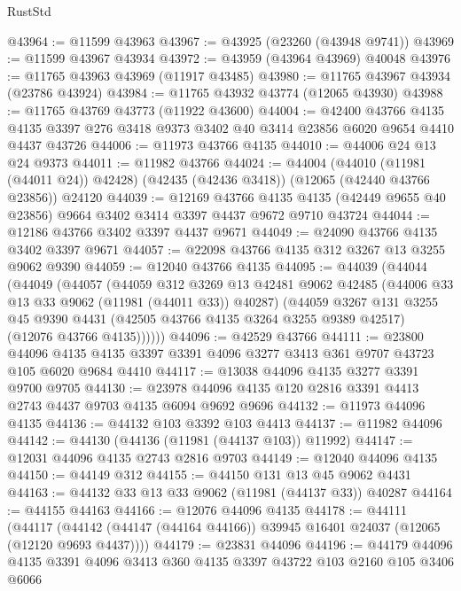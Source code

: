 \begin{lexlean}{RustStd}
\begin{coremodule}
@43964 := @11599 @43963
@43967 := @43925 (@23260 (@43948 @9741))
@43969 := @11599 @43967 @43934
@43972 := @43959 (@43964 @43969) @40048
@43976 := @11765 @43963 @43969 (@11917 @43485)
@43980 := @11765 @43967 @43934 (@23786 @43924)
@43984 := @11765 @43932 @43774 (@12065 @43930)
@43988 := @11765 @43769 @43773 (@11922 @43600)
@44004 := @42400
    @43766
    @4135
    @4135
    @3397
    @276
    @3418
    @9373
    @3402
    @40
    @3414
    @23856
    @6020
    @9654
    @4410
    @4437
    @43726
@44006 := @11973 @43766 @4135
@44010 := @44006 @24 @13 @24 @9373
@44011 := @11982 @43766
@44024 := @44004
    (@44010 (@11981 (@44011 @24)) @42428)
    (@42435 (@42436 @3418))
    (@12065 (@42440 @43766 @23856))
    @24120
@44039 := @12169
    @43766
    @4135
    @4135
    (@42449 @9655 @40 @23856)
    @9664
    @3402
    @3414
    @3397
    @4437
    @9672
    @9710
    @43724
@44044 := @12186 @43766 @3402 @3397 @4437 @9671
@44049 := @24090 @43766 @4135 @3402 @3397 @9671
@44057 := @22098 @43766 @4135 @312 @3267 @13 @3255 @9062 @9390
@44059 := @12040 @43766 @4135
@44095 := @44039
    (@44044
      (@44049
        (@44057
          (@44059
            @312
            @3269
            @13
            @42481
            @9062
            @42485
            (@44006 @33 @13 @33 @9062 (@11981 (@44011 @33)) @40287)
            (@44059
              @3267
              @131
              @3255
              @45
              @9390
              @4431
              (@42505 @43766 @4135 @3264 @3255 @9389 @42517)
              (@12076 @43766 @4135))))))
@44096 := @42529 @43766
@44111 := @23800
    @44096
    @4135
    @4135
    @3397
    @3391
    @4096
    @3277
    @3413
    @361
    @9707
    @43723
    @105
    @6020
    @9684
    @4410
@44117 := @13038 @44096 @4135 @3277 @3391 @9700 @9705
@44130 := @23978 @44096 @4135 @120 @2816 @3391 @4413 @2743 @4437 @9703 @4135 @6094 @9692 @9696
@44132 := @11973 @44096 @4135
@44136 := @44132 @103 @3392 @103 @4413
@44137 := @11982 @44096
@44142 := @44130 (@44136 (@11981 (@44137 @103)) @11992)
@44147 := @12031 @44096 @4135 @2743 @2816 @9703
@44149 := @12040 @44096 @4135
@44150 := @44149 @312
@44155 := @44150 @131 @13 @45 @9062 @4431
@44163 := @44132 @33 @13 @33 @9062 (@11981 (@44137 @33)) @40287
@44164 := @44155 @44163
@44166 := @12076 @44096 @4135
@44178 := @44111
    (@44117 (@44142 (@44147 (@44164 @44166)) @39945 @16401 @24037 (@12065 (@12120 @9693 @4437))))
@44179 := @23831 @44096
@44196 := @44179
    @44096
    @4135
    @3391
    @4096
    @3413
    @360
    @4135
    @3397
    @43722
    @103
    @2160
    @105
    @3406
    @6066

\end{coremodule}
\end{lexlean}
